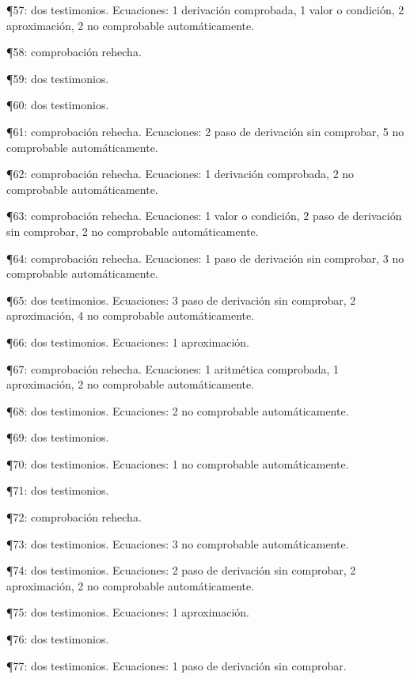 \documentclass[10pt,openany]{book}
\begin{document}
\noindent ¶57: dos testimonios. Ecuaciones: 1 derivación comprobada, 1 valor o condición, 2 aproximación, 2 no comprobable automáticamente.\par
\noindent ¶58: comprobación rehecha.\par
\noindent ¶59: dos testimonios.\par
\noindent ¶60: dos testimonios.\par
\noindent ¶61: comprobación rehecha. Ecuaciones: 2 paso de derivación sin comprobar, 5 no comprobable automáticamente.\par
\noindent ¶62: comprobación rehecha. Ecuaciones: 1 derivación comprobada, 2 no comprobable automáticamente.\par
\noindent ¶63: comprobación rehecha. Ecuaciones: 1 valor o condición, 2 paso de derivación sin comprobar, 2 no comprobable automáticamente.\par
\noindent ¶64: comprobación rehecha. Ecuaciones: 1 paso de derivación sin comprobar, 3 no comprobable automáticamente.\par
\noindent ¶65: dos testimonios. Ecuaciones: 3 paso de derivación sin comprobar, 2 aproximación, 4 no comprobable automáticamente.\par
\noindent ¶66: dos testimonios. Ecuaciones: 1 aproximación.\par
\noindent ¶67: comprobación rehecha. Ecuaciones: 1 aritmética comprobada, 1 aproximación, 2 no comprobable automáticamente.\par
\noindent ¶68: dos testimonios. Ecuaciones: 2 no comprobable automáticamente.\par
\noindent ¶69: dos testimonios.\par
\noindent ¶70: dos testimonios. Ecuaciones: 1 no comprobable automáticamente.\par
\noindent ¶71: dos testimonios.\par
\noindent ¶72: comprobación rehecha.\par
\noindent ¶73: dos testimonios. Ecuaciones: 3 no comprobable automáticamente.\par
\noindent ¶74: dos testimonios. Ecuaciones: 2 paso de derivación sin comprobar, 2 aproximación, 2 no comprobable automáticamente.\par
\noindent ¶75: dos testimonios. Ecuaciones: 1 aproximación.\par
\noindent ¶76: dos testimonios.\par
\noindent ¶77: dos testimonios. Ecuaciones: 1 paso de derivación sin comprobar.\par
\end{document}
